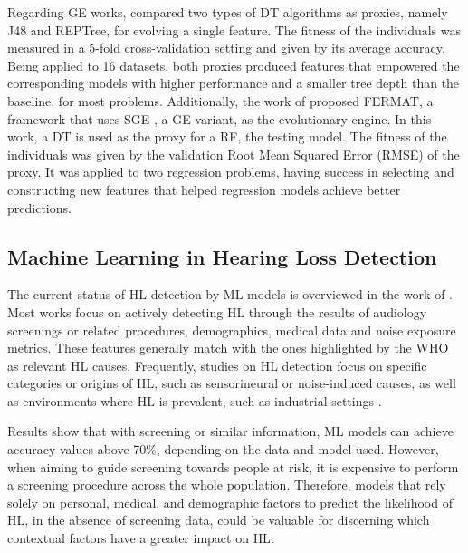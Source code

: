 Regarding \gls{GE} \cite{ryan1998grammatical} works, \citet{miquilini2016enhancing} compared two types of \gls{DT} algorithms as proxies, namely J48 and REPTree, for evolving a single feature. The fitness of the individuals was measured in a 5-fold cross-validation setting and given by its average accuracy. Being applied to 16 datasets, both proxies produced features that empowered the corresponding models with higher performance and a smaller tree depth than the baseline, for most problems. Additionally, the work of \citet{monteiro2021fermat} proposed FERMAT, a framework that uses \gls{SGE} \cite{lourencco2016sge,lourencco2018structured}, a \gls{GE} variant, as the evolutionary engine. In this work, a \gls{DT} is used as the proxy for a \gls{RF}, the testing model. The fitness of the individuals was given by the validation Root Mean Squared Error (RMSE) of the proxy. It was applied to two regression problems, having success in selecting and constructing new features that helped regression models achieve better predictions.


\subsection{Machine Learning in Hearing Loss Detection}

The current status of \gls{HL} detection by \gls{ML} models is overviewed in the work of \citet{miranda2022hytea}. Most works focus on actively detecting \gls{HL} through the results of audiology screenings or related procedures, demographics, medical data and noise exposure metrics. These features generally match with the ones highlighted by the \gls{WHO} as relevant \gls{HL} causes. Frequently, studies on \gls{HL} detection focus on specific categories or origins of \gls{HL}, such as sensorineural or noise-induced causes, as well as environments where \gls{HL} is prevalent, such as industrial settings \cite{tomiazzi2019performance}. 

Results show that with screening or similar information, \gls{ML} models can achieve accuracy values above 70\%, depending on the data and model used. However, when aiming to guide screening towards people at risk, it is expensive to perform a screening procedure across the whole population. Therefore, models that rely solely on personal, medical, and demographic factors to predict the likelihood of \gls{HL}, in the absence of screening data, could be valuable for discerning which contextual factors have a greater impact on \gls{HL}.

 